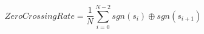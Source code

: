 \begin{equation}
\mathit{Zero Crossing Rate} = \frac{1}{N} \sum_{i=0}^{N-2} sgn(s_i) \oplus sgn(s_{i+1})
\label{formula_zero_crossing_rate}
\end{equation}

